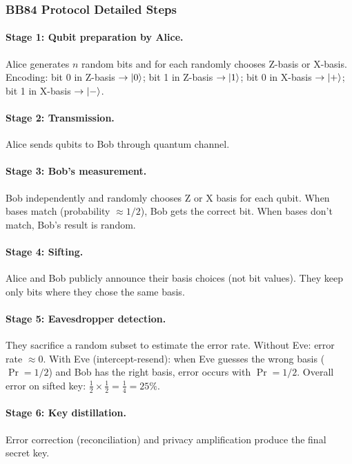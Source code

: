 \documentclass[10pt,a4paper]{article}
\begin{document}
\subsubsection*{BB84 Protocol Detailed Steps}

\paragraph{Stage 1: Qubit preparation by Alice.}
Alice generates $n$ random bits and for each randomly chooses Z-basis or X-basis. Encoding: bit 0 in Z-basis $\to\ket{0}$; bit 1 in Z-basis $\to\ket{1}$; bit 0 in X-basis $\to\ket{+}$; bit 1 in X-basis $\to\ket{-}$.

\paragraph{Stage 2: Transmission.}
Alice sends qubits to Bob through quantum channel.

\paragraph{Stage 3: Bob's measurement.}
Bob independently and randomly chooses Z or X basis for each qubit. When bases match (probability $\approx 1/2$), Bob gets the correct bit. When bases don't match, Bob's result is random.

\paragraph{Stage 4: Sifting.}
Alice and Bob publicly announce their basis choices (not bit values). They keep only bits where they chose the same basis.

\paragraph{Stage 5: Eavesdropper detection.}
They sacrifice a random subset to estimate the error rate. Without Eve: error rate $\approx 0$. With Eve (intercept-resend): when Eve guesses the wrong basis ($\Pr=1/2$) and Bob has the right basis, error occurs with $\Pr=1/2$. Overall error on sifted key: $\frac{1}{2}\times\frac{1}{2}=\frac{1}{4}=25\%$.

\paragraph{Stage 6: Key distillation.}
Error correction (reconciliation) and privacy amplification produce the final secret key.
\end{document}
